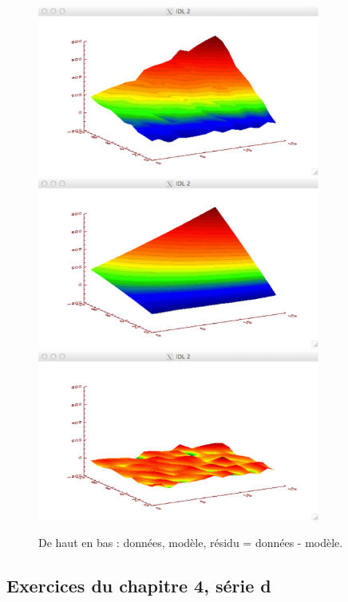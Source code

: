 \documentclass[main.tex]{subfiles}
\begin{document}
\begin{figure}[p]
    \centering
    \includegraphics[width=9.3cm]{assets/figures/exempleData.pdf}\vspace{5mm}
    \includegraphics[width=9.3cm]{assets/figures/exempleModel.pdf}\vspace{5mm}
    \includegraphics[width=9.3cm]{assets/figures/exempleResidu.pdf}
    \caption{De haut en bas : données, modèle, résidu = données - modèle.}
    \label{fig:dmr}
\end{figure}

\fi
\iftrue

\pagebreak
\newpage


\subsection{Exercices du chapitre 4, série d}
\end{document}
